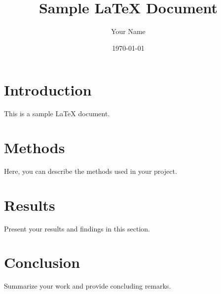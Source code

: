 \documentclass{article}
\begin{document}
\title{Sample LaTeX Document}
\author{Your Name}
\date{\today}

\maketitle

\section{Introduction}
This is a sample LaTeX document.

\section{Methods}
Here, you can describe the methods used in your project.

\section{Results}
Present your results and findings in this section.

\section{Conclusion}
Summarize your work and provide concluding remarks.
\end{document}
